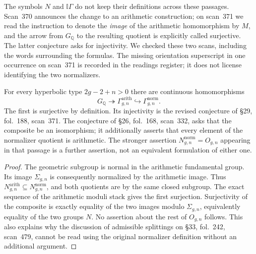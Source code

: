 The symbols $N$ and $\mathbb I\Gamma$ do not keep their definitions across
these passages.  Scan~370 announces the change to an arithmetic construction;
on scan~371 we read the instruction to denote the \emph{image} of the
arithmetic homomorphism by $M$, and the arrow
from $G_{\mathbb Q}$ to the resulting quotient is explicitly called
surjective.  The latter conjecture asks for injectivity.  We checked these
two scans, including the words surrounding the formulas.  The missing
orientation superscript in one occurrence on scan~371 is recorded in the
readings register; it does not license identifying the two normalizers.

For every hyperbolic type $2g-2+n>0$ there are continuous homomorphisms
\[
 G_{\mathbb Q}\twoheadrightarrow\Gamma^{\mathrm{arith}}_{g,n}
 \hookrightarrow\Gamma^{\mathrm{norm}}_{g,n}.
\]
The first is surjective by definition.  Its injectivity is the revised
conjecture of \S29, fol.~188, scan~371.  The conjecture of \S26,
fol.~168, scan~332, asks that the composite be an isomorphism; it additionally
asserts that every element of the normalizer quotient is arithmetic.
The stronger assertion $N^{\mathrm{norm}}_{g,n}=O_{g,n}$ appearing in that
passage is a further assertion, not an equivalent formulation of either one.
\begin{proof}
The geometric subgroup is normal in the arithmetic fundamental group.
Its image $\Sigma_{g,n}$ is consequently normalized by the arithmetic image.
Thus $N^{\mathrm{arith}}_{g,n}\subseteq N^{\mathrm{norm}}_{g,n}$, and both
quotients are by the same closed subgroup.  The exact sequence of the
arithmetic moduli stack gives the first surjection.  Surjectivity of the
composite is exactly equality of the two images modulo $\Sigma_{g,n}$,
equivalently equality of the two groups $N$.  No assertion about the rest of
$O_{g,n}$ follows.  This also explains why the discussion of admissible
splittings on \S33, fol.~242, scan~479, cannot be read using the original
normalizer definition without an additional argument.
\end{proof}

